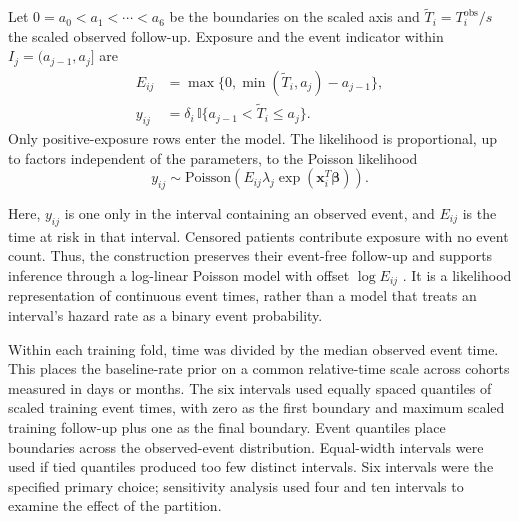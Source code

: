 Let $0=a_0<a_1<\cdots<a_6$ be the boundaries on the scaled axis and $\widetilde T_i=T_i^{\mathrm{obs}}/s$ the scaled observed follow-up. Exposure and the event indicator within $I_j=(a_{j-1},a_j]$ are
\begin{equation}
\begin{aligned}
E_{ij}&=\max\{0,\min(\widetilde T_i,a_j)-a_{j-1}\},\\
y_{ij}&=\delta_i\,\mathbb{I}\{a_{j-1}<\widetilde T_i\leq a_j\}.
\end{aligned}
\end{equation}
Only positive-exposure rows enter the model. The likelihood is proportional, up to factors independent of the parameters, to the Poisson likelihood
\begin{equation}
    y_{ij} \sim \text{Poisson}\left( E_{ij}\lambda_{j}\exp\left( \mathbf{x}_{i}^{T}\mathbf{\beta} \right) \right).
\end{equation}

Here, $y_{ij}$ is one only in the interval containing an observed event, and $E_{ij}$ is the time at risk in that interval. Censored patients contribute exposure with no event count. Thus, the construction preserves their event-free follow-up and supports inference through a log-linear Poisson model with offset $\log E_{ij}$ \cite{laird1981,friedman1982,ref46}. It is a likelihood representation of continuous event times, rather than a model that treats an interval's hazard rate as a binary event probability.

Within each training fold, time was divided by the median observed event time. This places the baseline-rate prior on a common relative-time scale across cohorts measured in days or months. The six intervals used equally spaced quantiles of scaled training event times, with zero as the first boundary and maximum scaled training follow-up plus one as the final boundary. Event quantiles place boundaries across the observed-event distribution. Equal-width intervals were used if tied quantiles produced too few distinct intervals. Six intervals were the specified primary choice; sensitivity analysis used four and ten intervals to examine the effect of the partition.

